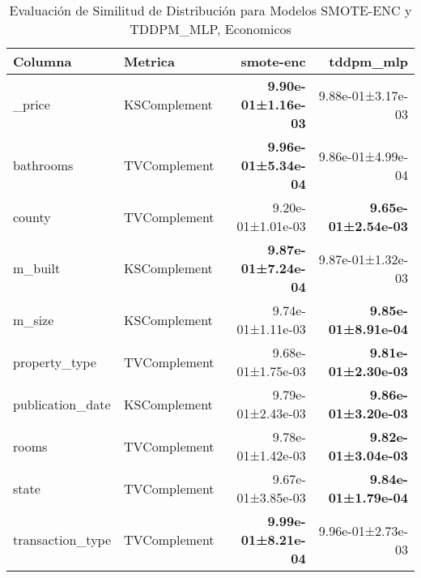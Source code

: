 \begin{table}[H]
\centering
\fontsize{10}{14}\selectfont
\caption{Evaluaci\'on de Similitud de Distribuci\'on para Modelos SMOTE-ENC y TDDPM\_MLP, Economicos}
\label{table-shape-economicos-a}
\begin{tabular}{|l|l|r|r|}
\hline
\rowcolor[gray]{0.8}
Columna & Metrica & smote-enc & tddpm\_mlp \\
\hline \_price & KSComplement & \bfseries 9.90e-01±1.16e-03 & 9.88e-01±3.17e-03 \\
\hline bathrooms & TVComplement & \bfseries 9.96e-01±5.34e-04 & 9.86e-01±4.99e-04 \\
\hline county & TVComplement & \cellcolor[rgb]{0.9, 0.54, 0.52} 9.20e-01±1.01e-03 & \cellcolor[rgb]{0.9, 0.54, 0.52} \bfseries 9.65e-01±2.54e-03 \\
\hline m\_built & KSComplement & \bfseries 9.87e-01±7.24e-04 & 9.87e-01±1.32e-03 \\
\hline m\_size & KSComplement & 9.74e-01±1.11e-03 & \bfseries 9.85e-01±8.91e-04 \\
\hline property\_type & TVComplement & 9.68e-01±1.75e-03 & \bfseries 9.81e-01±2.30e-03 \\
\hline publication\_date & KSComplement & 9.79e-01±2.43e-03 & \bfseries 9.86e-01±3.20e-03 \\
\hline rooms & TVComplement & 9.78e-01±1.42e-03 & \bfseries 9.82e-01±3.04e-03 \\
\hline state & TVComplement & 9.67e-01±3.85e-03 & \bfseries 9.84e-01±1.79e-04 \\
\hline transaction\_type & TVComplement & \bfseries 9.99e-01±8.21e-04 & 9.96e-01±2.73e-03 \\
\hline
\end{tabular}
\end{table}

